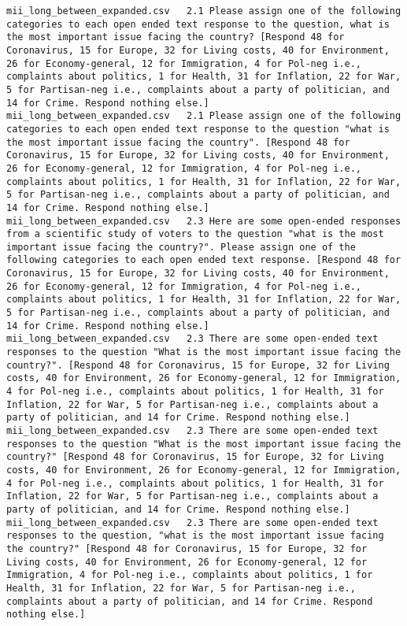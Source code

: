 \begin{lstlisting}[label=lst:promptvariants]
mii_long_between_expanded.csv	2.1	Please assign one of the following categories to each open ended text response to the question, what is the most important issue facing the country? [Respond 48 for Coronavirus, 15 for Europe, 32 for Living costs, 40 for Environment, 26 for Economy-general, 12 for Immigration, 4 for Pol-neg i.e., complaints about politics, 1 for Health, 31 for Inflation, 22 for War, 5 for Partisan-neg i.e., complaints about a party of politician, and 14 for Crime. Respond nothing else.]
mii_long_between_expanded.csv	2.1	Please assign one of the following categories to each open ended text response to the question "what is the most important issue facing the country". [Respond 48 for Coronavirus, 15 for Europe, 32 for Living costs, 40 for Environment, 26 for Economy-general, 12 for Immigration, 4 for Pol-neg i.e., complaints about politics, 1 for Health, 31 for Inflation, 22 for War, 5 for Partisan-neg i.e., complaints about a party of politician, and 14 for Crime. Respond nothing else.]
mii_long_between_expanded.csv	2.3	Here are some open-ended responses from a scientific study of voters to the question "what is the most important issue facing the country?". Please assign one of the following categories to each open ended text response. [Respond 48 for Coronavirus, 15 for Europe, 32 for Living costs, 40 for Environment, 26 for Economy-general, 12 for Immigration, 4 for Pol-neg i.e., complaints about politics, 1 for Health, 31 for Inflation, 22 for War, 5 for Partisan-neg i.e., complaints about a party of politician, and 14 for Crime. Respond nothing else.]
mii_long_between_expanded.csv	2.3	There are some open-ended text responses to the question "What is the most important issue facing the country?". [Respond 48 for Coronavirus, 15 for Europe, 32 for Living costs, 40 for Environment, 26 for Economy-general, 12 for Immigration, 4 for Pol-neg i.e., complaints about politics, 1 for Health, 31 for Inflation, 22 for War, 5 for Partisan-neg i.e., complaints about a party of politician, and 14 for Crime. Respond nothing else.]
mii_long_between_expanded.csv	2.3	There are some open-ended text responses to the question "What is the most important issue facing the country?" [Respond 48 for Coronavirus, 15 for Europe, 32 for Living costs, 40 for Environment, 26 for Economy-general, 12 for Immigration, 4 for Pol-neg i.e., complaints about politics, 1 for Health, 31 for Inflation, 22 for War, 5 for Partisan-neg i.e., complaints about a party of politician, and 14 for Crime. Respond nothing else.]
mii_long_between_expanded.csv	2.3	There are some open-ended text responses to the question, "what is the most important issue facing the country?" [Respond 48 for Coronavirus, 15 for Europe, 32 for Living costs, 40 for Environment, 26 for Economy-general, 12 for Immigration, 4 for Pol-neg i.e., complaints about politics, 1 for Health, 31 for Inflation, 22 for War, 5 for Partisan-neg i.e., complaints about a party of politician, and 14 for Crime. Respond nothing else.]

\end{lstlisting}

